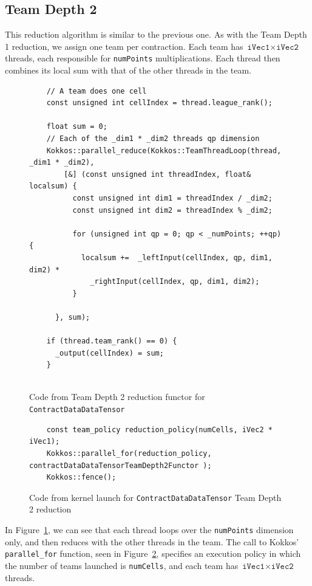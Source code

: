 \subsection{Team Depth 2}
    This reduction algorithm is similar to the previous one.  As with the Team
    Depth 1 reduction, we assign one team per contraction.  Each team has
    $\texttt{iVec1} \times \texttt{iVec2}$ threads, each responsible for
    \texttt{numPoints} multiplications.  Each thread then combines its local sum
    with that of the other threads in the team.

\begin{figure}[ht]
    \begin{lstlisting}
    // A team does one cell
    const unsigned int cellIndex = thread.league_rank();

    float sum = 0;
    // Each of the _dim1 * _dim2 threads qp dimension
    Kokkos::parallel_reduce(Kokkos::TeamThreadLoop(thread, _dim1 * _dim2),
        [&] (const unsigned int threadIndex, float& localsum) {
          const unsigned int dim1 = threadIndex / _dim2;
          const unsigned int dim2 = threadIndex % _dim2;

          for (unsigned int qp = 0; qp < _numPoints; ++qp) {
            localsum +=  _leftInput(cellIndex, qp, dim1, dim2) *
              _rightInput(cellIndex, qp, dim1, dim2);
          }

      }, sum);

    if (thread.team_rank() == 0) {
      _output(cellIndex) = sum;
    }
    
 \end{lstlisting}
\caption{Code from Team Depth 2 reduction functor for \texttt{ContractDataDataTensor}
\label{lst:ContractDataDataTensorDepth2Functor}} 
\end{figure}

\begin{figure}[ht]
    \begin{lstlisting}
    const team_policy reduction_policy(numCells, iVec2 * iVec1);
    Kokkos::parallel_for(reduction_policy, contractDataDataTensorTeamDepth2Functor );
    Kokkos::fence();
 \end{lstlisting}
\caption{Code from kernel launch for \texttt{ContractDataDataTensor} Team Depth
2 reduction
\label{lst:ContractDataDataTensorDepth2Call}} 
\end{figure}

In Figure~\ref{lst:ContractDataDataTensorDepth2Functor}, we can see that each
thread loops over the \texttt{numPoints} dimension only, and then
reduces with the other threads in the team.  The call to Kokkos'
\texttt{parallel\_for} function, seen in
Figure~\ref{lst:ContractDataDataTensorDepth2Call}, specifies an execution policy
in which the number of teams launched is \texttt{numCells}, and each team has
$\texttt{iVec1}\times\texttt{iVec2}$ threads.

